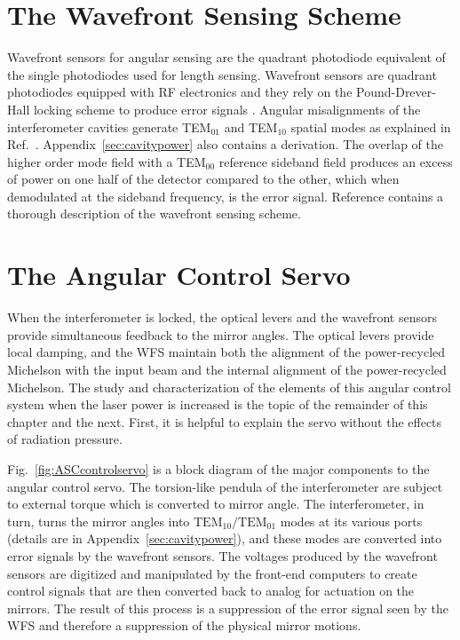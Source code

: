 \section{The Wavefront Sensing Scheme}
\label{sec:WFSsensing}
Wavefront sensors for angular sensing are the quadrant photodiode equivalent of the single photodiodes used for length sensing. Wavefront sensors are quadrant photodiodes equipped with RF electronics and they rely on the Pound-Drever-Hall locking scheme to produce error signals \cite{Sigg1996Wavefront}. Angular misalignments of the interferometer cavities generate TEM$_{01}$ and TEM$_{10}$ spatial modes as explained in Ref.~\cite{Anderson1984Alignment}. Appendix~\ref{sec:cavitypower} also contains a derivation. The overlap of the higher order mode field with a TEM$_{00}$ reference sideband field produces an excess of power on one half of the detector compared to the other, which when demodulated at the sideband frequency, is the error signal. Reference \cite{Fritschel1998Alignment} contains a thorough description of the wavefront sensing scheme.



\section{The Angular Control Servo}
When the interferometer is locked, the optical levers and the wavefront sensors provide simultaneous feedback to the mirror angles. The optical levers provide local damping, and the WFS maintain both the alignment of the power-recycled Michelson with the input beam and the internal alignment of the power-recycled Michelson. The study and characterization of the elements of this angular control system when the laser power is increased is the topic of the remainder of this chapter and the next. First, it is helpful to explain the servo without the effects of radiation pressure.

Fig.~\ref{fig:ASCcontrolservo} is a block diagram of the major components to the angular control servo. The torsion-like pendula of the interferometer are subject to external torque which is converted to mirror angle. The interferometer, in turn, turns the mirror angles into $\mathrm{TEM}_{10}/\mathrm{TEM}_{01}$ modes at its various ports (details are in Appendix~\ref{sec:cavitypower}), and these modes are converted into error signals by the wavefront sensors. The voltages produced by the wavefront sensors are digitized and manipulated by the front-end computers to create control signals that are then converted back to analog for actuation on the mirrors. The result of this process is a suppression of the error signal seen by the WFS and therefore a suppression of the physical mirror motions. 

